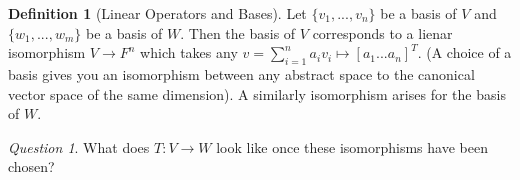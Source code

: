 \documentclass[12pt]{article}
\theoremstyle{definition}
\newtheorem{defn}[thm]{Definition}
\theoremstyle{remark}
\newtheorem*{qst}{Question}
\numberwithin{equation}{section}
\begin{document}
\vspace{15pt}


\begin{defn}[Linear Operators and Bases]
        Let $\{v_1,...,v_n\}$ be a basis of $V$ and $\{w_1,...,w_m\}$ be a basis of $W$. Then the basis of $V$ corresponds to a lienar isomorphism $V \rightarrow F^n$ which takes any $v = \sum\limits_{i=1}^na_iv_i \mapsto [a_1 ... a_n]^T$. (A choice of a basis gives you an isomorphism between any abstract space to the canonical vector space of the same dimension). A similarly isomorphism arises for the basis of $W$.
\end{defn}

\vspace{15pt}

\begin{qst}
        What does $T:V\rightarrow W$ look like once these isomorphisms have been chosen?
\end{qst}
\end{document}
